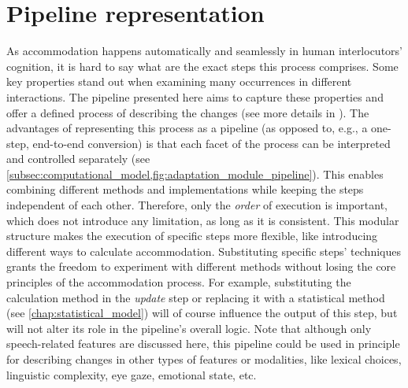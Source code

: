 \section{Pipeline representation}
\label{sec:pipeline_representation}

As accommodation  happens automatically and seamlessly in human interlocutors' cognition, it is hard to say what are the exact steps this process comprises.
Some key properties stand out when examining many occurrences in different interactions.
The pipeline presented here aims to capture these properties and offer a defined process of describing the changes (see more details in \citet{Raveh2017Interspeech}).
The advantages of representing this process as a pipeline (as opposed to, e.g., a one-step, end-to-end conversion) is that each facet of the process can be interpreted and controlled separately (see \cref{subsec:computational_model,fig:adaptation_module_pipeline}).
This enables combining different methods and implementations while keeping the steps independent of each other.
Therefore, only the \emph{order} of execution is important, which does not introduce any limitation, as long as it is consistent.
This modular structure makes the execution of specific steps more flexible, like introducing different ways to calculate accommodation.
Substituting specific steps' techniques grants the freedom to experiment with different methods without losing the core principles of the accommodation process.
For example, substituting the calculation method in the \textit{update} step or replacing it with a statistical method (see \cref{chap:statistical_model})
will of course influence the output of this step, but will not alter its role in the pipeline's overall logic.
Note that although only speech-related features are discussed here, this pipeline could be used in principle for describing changes in other types of features or modalities, like lexical choices, linguistic complexity, eye gaze, emotional state, etc.

